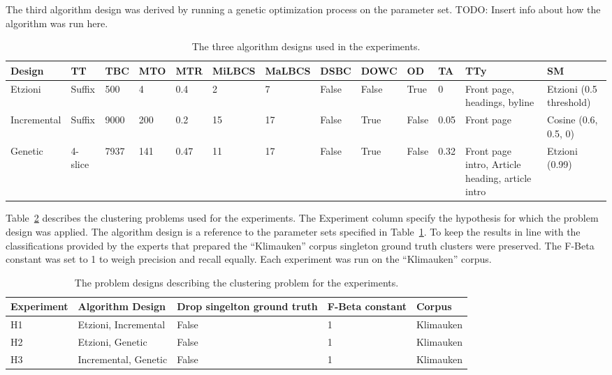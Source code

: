 The third algorithm design was derived by running a genetic optimization process on the parameter set. TODO: Insert info about how the algorithm was run here.

\begin{landscape}
\begin{table}
\small
\begin{center}
  \begin{tabular}{|p{1.5cm}|p{1.5cm}|p{1cm}|p{1.5cm}|p{1.5cm}|p{1.5cm}|p{1.5cm}|p{1.5cm}|p{1.5cm}|p{1cm}|p{1.5cm}|p{1.5cm}|p{1.5cm}|}
  \hline
  Design & TT & TBC & MTO & MTR & MiLBCS & MaLBCS & DSBC & DOWC & OD & TA & TTy & SM\\ 
  \hline
  Etzioni & Suffix & 500 & 4 & 0.4 & 2 & 7 & False & False & True & 0 & Front page, headings, byline & Etzioni (0.5 threshold) \\
  \hline
  Incremental & Suffix & 9000 & 200 & 0.2 & 15 & 17 & False & True & False & 0.05 & Front page & Cosine (0.6, 0.5, 0) \\
  \hline
  Genetic & 4-slice & 7937 & 141 & 0.47 & 11 & 17 & False & True & False & 0.32 & Front page intro, Article heading, article intro & Etzioni (0.99) \\
  \hline
  \end{tabular}
\end{center}
\caption{The three algorithm designs used in the experiments.}
\label{tab:algorithmdesign}
\end{table}
\end{landscape}

Table~\ref{tab:problemdesign} describes the clustering problems used for the experiments. The Experiment column specify the hypothesis for which the problem design was applied. The algorithm design is a reference to the parameter sets specified in Table~\ref{tab:algorithmdesign}. To keep the results in line with the classifications provided by the experts that prepared the ``Klimauken'' corpus singleton ground truth clusters were preserved. The F-Beta constant was set to 1 to weigh precision and recall equally. Each experiment was run on the ``Klimauken'' corpus.

\begin{table}
\small
\begin{center}
  \begin{tabular}{|l|l|l|l|l|}
  \hline
  Experiment & Algorithm Design & Drop singelton ground truth & F-Beta constant & Corpus\\ 
  \hline
  H1 & Etzioni, Incremental & False & 1 & Klimauken\\
  \hline
  H2 & Etzioni, Genetic & False & 1 & Klimauken\\
  \hline
  H3 & Incremental, Genetic & False & 1 & Klimauken\\
  \hline
  \end{tabular}
\end{center}
\caption{The problem designs describing the clustering problem for the experiments.}
\label{tab:problemdesign}
\end{table}